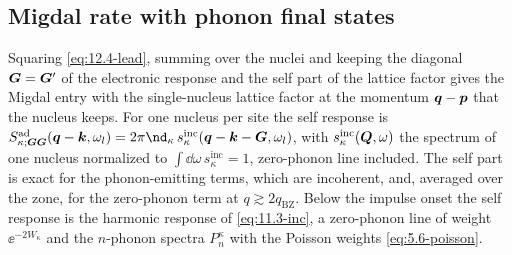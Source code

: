 \subsection{Migdal rate with phonon final states}\label{sec:12.4-rate}

Squaring \cref{eq:12.4-lead}, summing over the nuclei and keeping the diagonal $\bm{G} = \bm{G}'$ of the electronic response and the self part of the lattice factor gives the Migdal entry with the single-nucleus lattice factor at the momentum $\bm{q} - \bm{p}$ that the nucleus keeps. For one nucleus per site the self response is $S^{\mathrm{ad}}_{\kappa;\vect{G}\vect{G}}(\vect{q} - \vect{k},\omega_l) = 2\pi\nd_\kappa\,s^{\mathrm{inc}}_\kappa(\vect{q} - \vect{k} - \vect{G},\omega_l)$, with $s^{\mathrm{inc}}_\kappa(\bm{Q},\omega)$ the spectrum of one nucleus normalized to $\int\dd\omega\,s^{\mathrm{inc}}_\kappa = 1$, zero-phonon line included. The self part is exact for the phonon-emitting terms, which are incoherent, and, averaged over the zone, for the zero-phonon term at $q \gtrsim 2q_{\mathrm{BZ}}$. Below the impulse onset the self response is the harmonic response of \cref{eq:11.3-inc}, a zero-phonon line of weight $\ee^{-2W_\kappa}$ and the $n$-phonon spectra $P^\kappa_n$ with the Poisson weights \cref{eq:5.6-poisson}.
